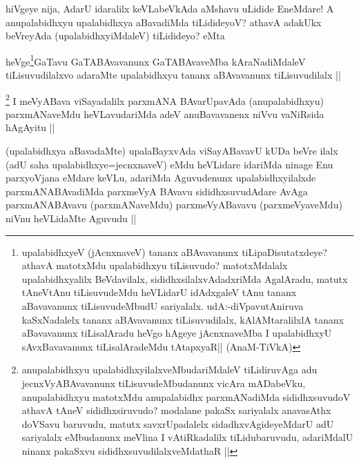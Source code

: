 
\begin{artha}
hiVgeye nija, AdarU idaralilx keVLabeVkAda aMshavu uLidide EneMdare! A anupalabidhxyu upalabidhxya aBavadiMda tiLidideyoV? athavA adakUkx beVreyAda (upalabidhxyiMdaleV) tiLidideyo? eMta
\end{artha}


\begin{artha}
heVge\footnote[1]{upalabidhxyeV (jAcnxnaveV) tananx aBAvavanunx tiLipaDisutatxdeye? athavA matotxMdu upalabidhxyu tiLisuvudo? matotxMdalalx upalabidhxyalilx BeVdavilalx, sididhxsilalxvAdadxriMda AgalAradu, matutx tAneVtAnu tiLisuvudeMdu heVLidarU idAdxgaleV tAnu tananx aBavavanunx tiLisuvudeMbudU sariyalalx. udA:-diVpavutAniruva kaSxNadalelx tananx aBAvavanunx tiLisuvudilalx, kAlAMtaralilxlA tananx aBavavanunx tiLisalAradu heVgo hAgeye jAcnxnaveMba I upalabidhxyU sAvxBavavanunx tiLisalAradeMdu tAtapxyaR|| (AnaM-TiVkA)}GaTavu GaTABAvavanunx GaTABAvaveMba kAraNadiMdaleV tiLisuvudilalxvo adaraMte upalabidhxyu tananx aBAvavanunx tiLisuvudilalx ||
\end{artha}

\begin{artha}
\footnote[1]{anupalabidhxyu upalabidhxyilalxveMbudariMdaleV tiLidiruvAga adu jecnxVyABAvavanunx tiLisuvudeMbudanunx vicAra mADabeVku, anupalabidhxyu matotxMdu anupalabidhx parxmANadiMda sididhxsuvudoV athavA tAneV sididhxsiruvudo? modalane pakaSx sariyalalx anavasAthx doVSavu baruvudu, matutx savxrUpadalelx sidadhxvAgideyeMdarU adU sariyalalx eMbudanunx meVlina I vAtiRkadalilx tiLidubaruvudu, adariMdalU ninanx pakaSxvu sididhxsuvudilalxveMdathaR ||}
I meVyABava viSayadalilx parxmANA BAvarUpavAda (anupalabidhxyu) parxmANaveMdu heVLavudariMda adeV anuBavavanenx niVvu vaNiRsida hAgAyitu ||
\end{artha}


\begin{artha}
(upalabidhxya aBavadaMte) upalaBayxvAda viSayABavavU kUDa beVre ilalx (adU saha upalabidhxye=jecnxnaveV) eMdu heVLidare idariMda ninage Enu parxyoVjana eMdare keVLu, adariMda Aguvudenunx upalabidhxyilalxde parxmANABAvadiMda parxmeVyA BAvavu sididhxsuvudAdare AvAga parxmANABAvavu (parxmANaveMdu) parxmeVyABavavu (parxmeVyaveMdu) niVnu heVLidaMte Aguvudu ||
\end{artha}

